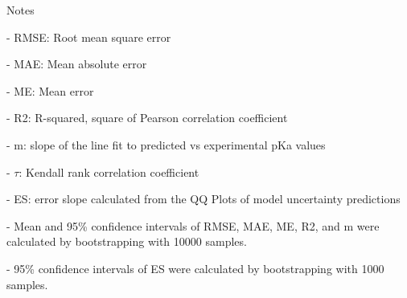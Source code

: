 \documentclass{article}
\begin{document}
Notes

- RMSE: Root mean square error

- MAE: Mean absolute error

- ME: Mean error

- R2: R-squared, square of Pearson correlation coefficient

- m: slope of the line fit to predicted vs experimental pKa values

- $\tau$:  Kendall rank correlation coefficient

- ES: error slope calculated from the QQ Plots of model uncertainty predictions

- Mean and 95\% confidence intervals of RMSE, MAE, ME, R2, and m were calculated by bootstrapping with 10000 samples.

- 95\% confidence intervals of ES were calculated by bootstrapping with 1000 samples.\end{document}
\end{document}

